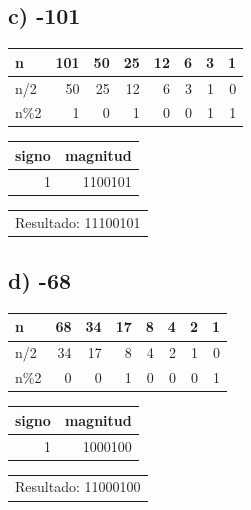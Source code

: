 \documentclass[12pt]{article}
\begin{document}
\subsection*{c) -101}
\label{sec:orgcd871ba}
\begin{mdframed}
\begin{center}
\begin{tabular}{lrrrrrrr}
n & 101 & 50 & 25 & 12 & 6 & 3 & 1\\
\hline
n/2 & 50 & 25 & 12 & 6 & 3 & 1 & 0\\
n\%2 & 1 & 0 & 1 & 0 & 0 & 1 & 1\\
\end{tabular}
\end{center}

\begin{center}
\begin{tabular}{rr}
signo & magnitud\\
\hline
1 & 1100101\\
\end{tabular}
\end{center}

\begin{center}
\begin{tabular}{l}
Resultado: 11100101\\
\end{tabular}
\end{center}
\end{mdframed}

\subsection*{d) -68}
\label{sec:org83afeba}
\begin{mdframed}
\begin{center}
\begin{tabular}{lrrrrrrr}
n & 68 & 34 & 17 & 8 & 4 & 2 & 1\\
\hline
n/2 & 34 & 17 & 8 & 4 & 2 & 1 & 0\\
n\%2 & 0 & 0 & 1 & 0 & 0 & 0 & 1\\
\end{tabular}
\end{center}

\begin{center}
\begin{tabular}{rr}
signo & magnitud\\
\hline
1 & 1000100\\
\end{tabular}
\end{center}

\begin{center}
\begin{tabular}{l}
Resultado: 11000100\\
\end{tabular}
\end{center}
\end{mdframed}
\end{document}
